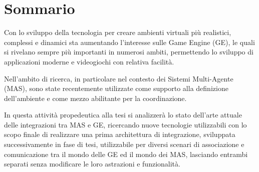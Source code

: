 \chapter{Sommario}

Con lo sviluppo della tecnologia per creare ambienti virtuali più realistici, complessi e dinamici sta aumentando l'interesse sulle Game Engine (GE), le quali si rivelano sempre più importanti in numerosi ambiti, permettendo lo sviluppo di applicazioni moderne e videogiochi con relativa facilità.

\medskip

Nell'ambito di ricerca, in particolare nel contesto dei Sistemi Multi-Agente (MAS), sono state recentemente utilizzate come supporto alla definizione dell'ambiente e come mezzo abilitante per la coordinazione.\cite{gamemas-woa2016}

\medskip

In questa attività propedeutica alla tesi si analizzerà lo stato dell’arte attuale delle integrazioni tra MAS e GE, ricercando nuove tecnologie utilizzabili con lo scopo finale di realizzare una prima architettura di integrazione, sviluppata successivamente in fase di tesi, utilizzabile per diversi scenari di associazione e comunicazione tra il mondo delle GE ed il mondo dei MAS, lasciando entrambi separati senza modificare le loro astrazioni e funzionalità.
